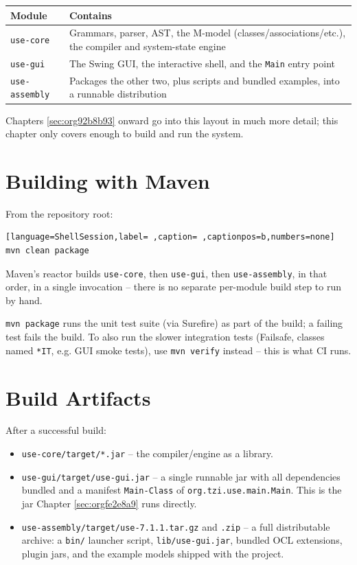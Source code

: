 \documentclass[11pt,twoside,a4paper]{book}
\begin{document}
\begin{center}
\begin{tabular}{lp{10cm}}
Module & Contains\\[0pt]
\hline
\texttt{use-core} & Grammars, parser, AST, the M-model (classes/associations/etc.), the compiler and system-state engine\\[0pt]
\texttt{use-gui} & The Swing GUI, the interactive shell, and the \texttt{Main} entry point\\[0pt]
\texttt{use-assembly} & Packages the other two, plus scripts and bundled examples, into a runnable distribution\\[0pt]
\end{tabular}
\end{center}

Chapters \ref{sec:org92b8b93} onward go into this layout in much more
detail; this chapter only covers enough to build and run the system.

\section{Building with Maven}
\label{sec:orgab5016f}
From the repository root:

\begin{lstlisting}[language=ShellSession,label= ,caption= ,captionpos=b,numbers=none]
mvn clean package
\end{lstlisting}

Maven's reactor builds \texttt{use-core}, then \texttt{use-gui}, then
\texttt{use-assembly}, in that order, in a single invocation -- there is no
separate per-module build step to run by hand.

\begin{manualnote}
\texttt{mvn package} runs the unit test suite (via Surefire) as part of the
build; a failing test fails the build. To also run the slower
integration tests (Failsafe, classes named \texttt{*IT}, e.g. GUI smoke
tests), use \texttt{mvn verify} instead -- this is what CI runs.
\end{manualnote}

\section{Build Artifacts}
\label{sec:orgffd822d}
After a successful build:

\begin{itemize}
\item \texttt{use-core/target/*.jar} -- the compiler/engine as a library.
\item \texttt{use-gui/target/use-gui.jar} -- a single runnable jar with all
dependencies bundled and a manifest \texttt{Main-Class} of
\texttt{org.tzi.use.main.Main}. This is the jar Chapter
\ref{sec:orgfe2e8a9} runs directly.
\item \texttt{use-assembly/target/use-7.1.1.tar.gz} and \texttt{.zip} -- a full
distributable archive: a \texttt{bin/} launcher script, \texttt{lib/use-gui.jar},
bundled OCL extensions, plugin jars, and the example models shipped
with the project.
\end{itemize}
\end{document}
